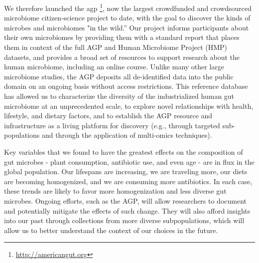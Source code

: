 We therefore launched the \gls{agp} \footnote{\url{http://americangut.org}}, now the
largest crowdfunded and crowdsourced microbiome citizen-science project to date,
with the goal to discover the kinds of microbes and microbiomes "in the wild.”
Our project informs participants about their own microbiomes by providing them with
a standard report that places them in context of the full AGP and Human Microbiome
Project (HMP) datasets, and provides a broad set of resources to support research
about the human microbiome, including an online course. Unlike many other large
microbiome studies, the AGP deposits all de-identified data into the public domain
on an ongoing basis without access restrictions. This reference database has allowed
us to characterize the diversity of the industrialized human gut microbiome at an
unprecedented scale, to explore novel relationships with health, lifestyle, and
dietary factors, and to establish the AGP resource and infrastructure as a living
platform for discovery (e.g., through targeted sub-populations and through the
application of multi-omics techniques).

Key variables that we found to have the greatest effects on the composition of gut
microbes - plant consumption, antibiotic use, and even age - are in flux in the global
population. Our lifespans are increasing, we are traveling more, our diets are
becoming homogenized, and we are consuming more antibiotics. In each case, these
trends are likely to favor more homogenization and less diverse gut microbes.
Ongoing efforts, such as the AGP, will allow researchers to document and potentially
mitigate the effects of such change. They will also afford insights into our past
through collections from more diverse subpopulations, which will allow us to better
understand the context of our choices in the future.

